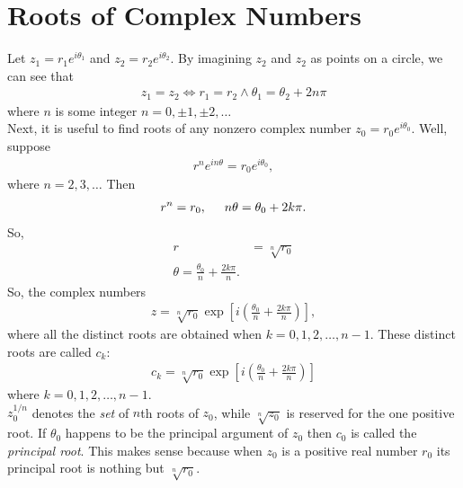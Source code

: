 \documentclass{book}
\theoremstyle{definition}
\newcommand{\f}[2]{\frac{#1}{#2}}
\newcommand{\lp}{\left(}
\newcommand{\rp}{\right)}
\newcommand{\lb}{\left[}
\newcommand{\rb}{\right]}
\begin{document}
\section{Roots of Complex Numbers}

Let $z_1 = r_1 e^{i\theta_1}$ and $z_2 = r_2 e^{i\theta_2}$. By imagining $z_2$ and $z_2$ as points on a circle, we can see that 
\begin{align}
z_1 = z_2 \iff r_1 = r_2 \wedge \theta_1 = \theta_2 + 2n\pi
\end{align}
where $n$ is some integer $n = 0,\pm 1, \pm 2,\dots$\\

Next, it is useful to find roots of any nonzero complex number $z_0 = r_0 e^{i\theta_0}$. Well, suppose
\begin{align}
r^n e^{in\theta} = r_0 e^{i\theta_0},
\end{align}
where $n=2,3,\dots$ Then 
\begin{align}
r^n = r_0, \hspace{0.5cm} n\theta = \theta_0 + 2k\pi.
\end{align}
So,
\begin{align}
r &= \sqrt[n]{r_0} \\ 
\theta = \f{\theta_0}{n} + \f{2k\pi}{n}.
\end{align}
So, the complex numbers
\begin{align}
z = \sqrt[n]{r_0}\exp\lb i \lp \f{\theta_0}{n} + \f{2k\pi}{n} \rp \rb ,
\end{align}
where all the distinct roots are obtained when $k = 0,1,2,\dots,n-1$. These distinct roots are called $c_k$:
\begin{align}
c_k = \sqrt[n]{r_0} \exp\lb i\lp \f{\theta_0}{n} + \f{2k\pi}{n} \rp \rb
\end{align}
where $k = 0,1,2,\dots,n-1$.\\



$z_0^{1/n}$ denotes the \textit{set} of $n$th roots of $z_0$, while $\sqrt[n]{z_0}$ is reserved for the one positive root. If $\theta_0$ happens to be the principal argument of $z_0$ then $c_0$ is called the \textit{principal root}. This makes sense because when $z_0$ is a positive real number $r_0$ its principal root is nothing but $\sqrt[n]{r_0}$.\\
\end{document}
